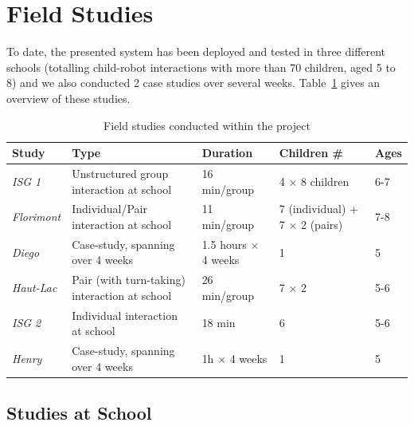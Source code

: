 \documentclass{article}
\begin{document}
\section{Field Studies}

To date, the presented system has been deployed and tested in three different
schools (totalling child-robot interactions with more than 70 children, aged 5
to 8) and we also conducted 2 case studies over several weeks.
Table~\ref{studies} gives an overview of these studies.

\begin{table}[ht!]
\centering
\caption{Field studies conducted within the project}
\label{studies}
\begin{tabular}{@{}lp{4.5cm}p{2.2cm}p{2.5cm}l@{}}
\toprule
{\bf Study}     & {\bf Type}                                    & {\bf Duration}              & {\bf Children \#}                     & {\bf Ages} \\ \midrule
{\it ISG 1}     & Unstructured group interaction at school      & 16 min/group               & 4 $\times$ 8 children                 & 6-7        \\
{\it Florimont} & Individual/Pair interaction at school         & 11 min/group               & 7 (individual) + 7 $\times$ 2 (pairs) & 7-8        \\
{\it Diego}     & Case-study, spanning over 4 weeks              & 1.5 hours $\times$ 4 weeks & 1                                     & 5          \\
{\it Haut-Lac}  & Pair (with turn-taking) interaction at school & 26 min/group                            & 7 $\times$ 2                          & 5-6        \\
{\it ISG 2}     & Individual interaction at school              & 18 min                            & 6                                     & 5-6        \\
{\it Henry}     & Case-study, spanning over 4 weeks              & 1h $\times$ 4 weeks        & 1                                     & 5          \\ \bottomrule
\end{tabular}
\end{table}

\subsection{Studies at School}
\end{document}
